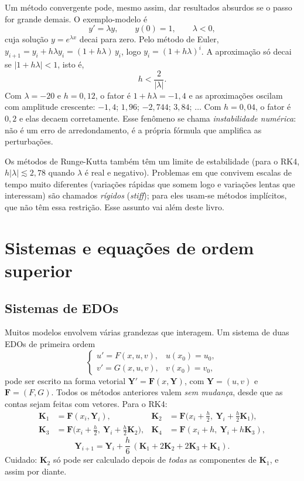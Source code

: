 Um método convergente pode, mesmo assim, dar resultados absurdos se o passo for grande demais.
O exemplo-modelo é
\[
y'=\lambda y,\qquad y(0)=1,\qquad \lambda<0,
\]
cuja solução $y=e^{\lambda x}$ decai para zero. Pelo método de Euler,
$y_{i+1}=y_i+h\lambda y_i=(1+h\lambda)\,y_i$, logo $y_i=(1+h\lambda)^i$. A aproximação só
decai se $|1+h\lambda|<1$, isto é,
\[
h<\frac{2}{|\lambda|}.
\]
Com $\lambda=-20$ e $h=0{,}12$, o fator é $1+h\lambda=-1{,}4$ e as aproximações oscilam com
amplitude crescente: $-1{,}4$; $1{,}96$; $-2{,}744$; $3{,}84$; $\dots$ Com $h=0{,}04$, o fator é $0{,}2$
e elas decaem corretamente. Esse fenômeno se chama \emph{instabilidade numérica}: não é um
erro de arredondamento, é a própria fórmula que amplifica as perturbações.

Os métodos de Runge-Kutta também têm um limite de estabilidade (para o RK4, $h|\lambda|\lesssim2{,}78$
quando $\lambda$ é real e negativo). Problemas em que convivem escalas de tempo muito diferentes
(variações rápidas que somem logo e variações lentas que interessam) são chamados
\emph{rígidos} (\emph{stiff}); para eles usam-se métodos implícitos, que não têm essa
restrição. Esse assunto vai além deste livro.

\section{Sistemas e equações de ordem superior}

\subsection{Sistemas de EDOs}

Muitos modelos envolvem várias grandezas que interagem. Um sistema de duas EDOs de primeira
ordem
\[
\begin{cases}u'=F(x,u,v),& u(x_0)=u_0,\\ v'=G(x,u,v),& v(x_0)=v_0,\end{cases}
\]
pode ser escrito na forma vetorial $\mathbf Y'=\mathbf F(x,\mathbf Y)$, com $\mathbf Y=(u,v)$ e
$\mathbf F=(F,G)$. Todos os métodos anteriores valem \emph{sem mudança}, desde que as contas
sejam feitas com vetores. Para o RK4:
\begin{align*}
\mathbf K_1&=\mathbf F(x_i,\mathbf Y_i), &
\mathbf K_2&=\mathbf F\bigl(x_i+\tfrac h2,\ \mathbf Y_i+\tfrac h2\mathbf K_1\bigr),\\
\mathbf K_3&=\mathbf F\bigl(x_i+\tfrac h2,\ \mathbf Y_i+\tfrac h2\mathbf K_2\bigr), &
\mathbf K_4&=\mathbf F(x_i+h,\ \mathbf Y_i+h\mathbf K_3),
\end{align*}
\[
\mathbf Y_{i+1}=\mathbf Y_i+\frac h6\,(\mathbf K_1+2\mathbf K_2+2\mathbf K_3+\mathbf K_4).
\]
Cuidado: $\mathbf K_2$ só pode ser calculado depois de \emph{todas} as componentes de
$\mathbf K_1$, e assim por diante.

